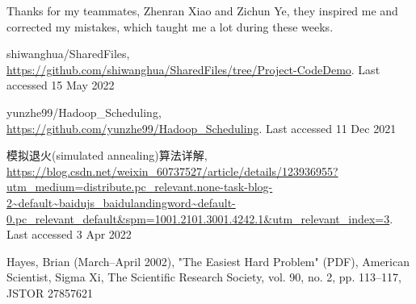 \documentclass{llncs}
\begin{document}
	Thanks for my teammates, Zhenran Xiao and Zichun Ye, they inspired me and corrected my mistakes, which taught me a lot during these weeks.
	
	
	\newpage
	
	\begin{thebibliography}{8}
		shiwanghua/SharedFiles, \url{https://github.com/shiwanghua/SharedFiles/tree/Project-CodeDemo}. Last accessed 15 May 2022
		
		yunzhe99/Hadoop\_Scheduling, \url{https://github.com/yunzhe99/Hadoop_Scheduling}. Last accessed 11 Dec 2021
		
		模拟退火(simulated annealing)算法详解, \url{https://blog.csdn.net/weixin_60737527/article/details/123936955?utm_medium=distribute.pc_relevant.none-task-blog-2~default~baidujs_baidulandingword~default-0.pc_relevant_default&spm=1001.2101.3001.4242.1&utm_relevant_index=3}. Last accessed 3 Apr 2022
		
		Hayes, Brian (March–April 2002), "The Easiest Hard Problem" (PDF), American Scientist, Sigma Xi, The Scientific Research Society, vol. 90, no. 2, pp. 113–117, JSTOR 27857621
		
	\end{thebibliography}
	
\end{document}
